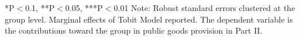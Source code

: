 \begin{table}[htbp]
\begin{tabular}{c c c c c}
\end{tabular}

\begin{footnotesize}
\newline
*P$<$0.1, **P$<$0.05, ***P$<$0.01
\newline
Note: Robust standard errors clustered at the group level. Marginal effects of Tobit Model reported. 
\newline
The dependent variable is the contributions toward the group in public goods provision in Part II. \end{footnotesize}
\end{table}